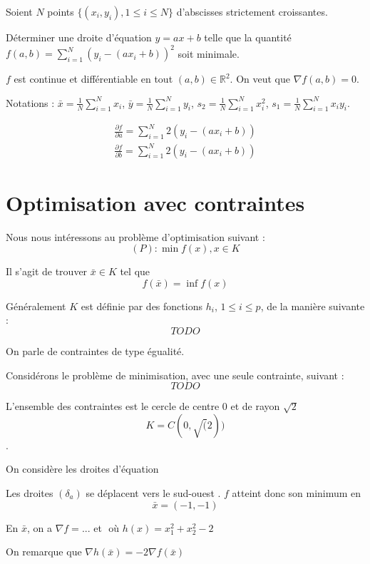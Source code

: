 		\begin{ex}%
		
		Soient $N$ points $\{(x_i, y_i), 1\leq i \leq N\}$ d'abscisses strictement croissantes.
		
		Déterminer une droite d'équation $y=ax+b$ telle que la quantité $\displaystyle f(a, b) = \sum_{i=1}^N (y_i-(ax_i+b))^2$ soit minimale.
		
		$f$ est continue et différentiable en tout $(a, b) \in \mathbb{R}^2$.
		On veut que $\nabla f(a, b) = 0$.
		
		Notations :
		$\displaystyle \bar{x} = \frac{1}{N} \sum_{i=1}^N x_i$, 
		$\displaystyle \bar{y} = \frac{1}{N} \sum_{i=1}^N y_i$, 
		$\displaystyle s_2 = \frac{1}{N} \sum_{i=1}^N x_i^2$, 
		$\displaystyle s_1 = \frac{1}{N} \sum_{i=1}^N x_i y_i$.
		
		\begin{eqnarray*}%
 \frac{\partial f}{\partial a} = \sum_{i=1}^N 2(y_i-(ax_i+b)) \\ \frac{\partial f}{\partial b} = \sum_{i=1}^N 2(y_i-(ax_i+b)) \end{eqnarray*}

		\end{ex}
		
		
\section{Optimisation avec contraintes}


Nous nous intéressons au problème d'optimisation suivant : \[ (P) : \min f(x), x \in K \]

Il s'agit de trouver $\bar{x} \in K$ tel que \[ f(\bar{x}) = \inf f(x) \]


Généralement $K$ est définie par des fonctions $h_i$, $1 \leq i \leq p$, de la manière suivante : \[ TODO \]

On parle de contraintes de type égualité.


\begin{ex}
	Considérons le problème de minimisation, avec une seule contrainte, suivant : \[ TODO \]	
	
	L'ensemble des contraintes est le cercle de centre 0 et de rayon $\sqrt 2$ \[ K = C(0, \sqrt(2)) \].
	
	On considère les droites d'équation \[  \]
	
	Les droites $(\delta_a)$ se déplacent vers le \og sud-ouest \fg. $f$ atteint donc son minimum en \[ \bar{x} = (-1, -1) \]
	
	En $\bar{x}$, on a $\displaystyle \nabla f = ...$ et $ $ où $h(x) = x_1^2 + x_2^2 - 2$
	
	On remarque que $ \nabla h( \bar{x} ) = -2  \nabla f( \bar{x} ) $
	
	
\end{ex}

